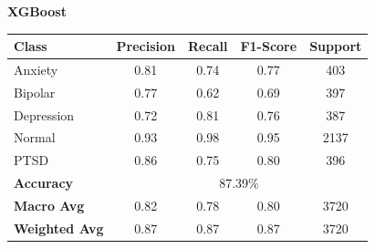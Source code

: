 
\begin{center}
    \textbf{XGBoost} \\[0.2em]
    \begin{tabular}{|l|c|c|c|c|}
        \hline
        \textbf{Class} & \textbf{Precision} & \textbf{Recall} & \textbf{F1-Score} & \textbf{Support} \\ \hline
        Anxiety        & 0.81               & 0.74            & 0.77              & 403              \\ \hline
        Bipolar        & 0.77               & 0.62            & 0.69              & 397              \\ \hline
        Depression     & 0.72               & 0.81            & 0.76              & 387              \\ \hline
        Normal         & 0.93               & 0.98            & 0.95              & 2137             \\ \hline
        PTSD           & 0.86               & 0.75            & 0.80              & 396              \\ \hline
        \textbf{Accuracy} & \multicolumn{4}{|c|}{87.39\%} \\ \hline
        \textbf{Macro Avg} & 0.82            & 0.78            & 0.80              & 3720             \\ \hline
        \textbf{Weighted Avg} & 0.87         & 0.87            & 0.87              & 3720             \\ \hline
    \end{tabular}
\end{center}



\pagebreak




